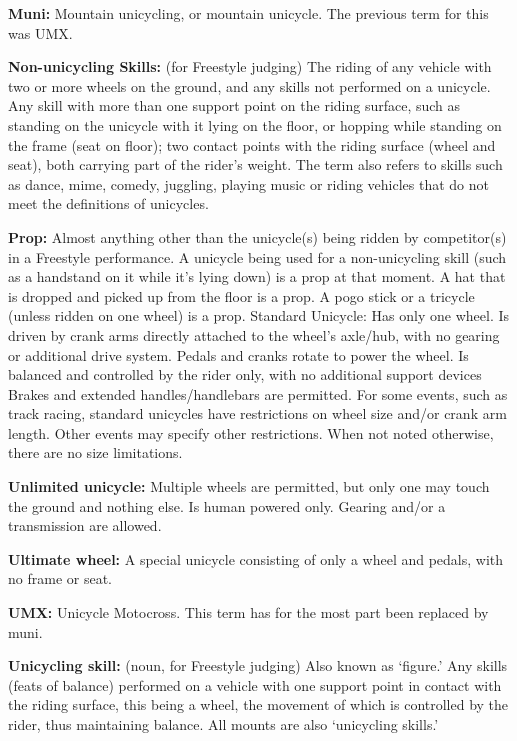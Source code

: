 \textbf{Muni:} Mountain unicycling, or mountain unicycle.
The previous term for this was UMX.

\textbf{Non-unicycling Skills:} (for Freestyle judging) The riding of any vehicle with two or more wheels on the ground, and any skills not performed on a unicycle.
Any skill with more than one support point on the riding surface, such as standing on the unicycle with it lying on the floor, or hopping while standing on the frame (seat on floor); two contact points with the riding surface (wheel and seat), both carrying part of the rider's weight.
The term also refers to skills such as dance, mime, comedy, juggling, playing music or riding vehicles that do not meet the definitions of unicycles.

\textbf{Prop:} Almost anything other than the unicycle(s) being ridden by competitor(s) in a Freestyle performance.
A unicycle being used for a non-unicycling skill (such as a handstand on it while it's lying down) is a prop at that moment.
A hat that is dropped and picked up from the floor is a prop.
A pogo stick or a tricycle (unless ridden on one wheel) is a prop.
{Standard Unicycle:} Has only one wheel.
Is driven by crank arms directly attached to the wheel's axle/hub, with no gearing or additional drive system.
Pedals and cranks rotate to power the wheel.
Is balanced and controlled by the rider only, with no additional support devices Brakes and extended handles/handlebars are permitted.
For some events, such as track racing, standard unicycles have restrictions on wheel size and/or crank arm length.
Other events may specify other restrictions.
When not noted otherwise, there are no size limitations.

\textbf{Unlimited unicycle:} Multiple wheels are permitted, but only one may touch the ground and nothing else.
Is human powered only.
Gearing and/or a transmission are allowed.

\textbf{Ultimate wheel:} A special unicycle consisting of only a wheel and pedals, with no frame or seat.

\textbf{UMX:} Unicycle Motocross.
This term has for the most part been replaced by muni.

\textbf{Unicycling skill:} (noun, for Freestyle judging) Also known as ‘figure.' Any skills (feats of balance) performed on a vehicle with one support point in contact with the riding surface, this being a wheel, the movement of which is controlled by the rider, thus maintaining balance.
All mounts are also ‘unicycling skills.' 

